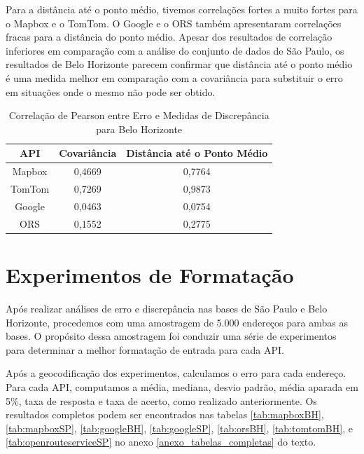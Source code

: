 Para a distância até o ponto médio, tivemos correlações fortes a muito fortes para o Mapbox e o TomTom. O Google e o ORS também apresentaram correlações fracas para a distância do ponto médio. Apesar dos resultados de correlação inferiores em comparação com a análise do conjunto de dados de São Paulo, os resultados de Belo Horizonte parecem confirmar que distância até o ponto médio é uma medida melhor em comparação com a covariância para substituir o erro em situações onde o mesmo não pode ser obtido.

\begin{table}[!ht]
    \centering
    \caption{Correlação de Pearson entre Erro e Medidas de Discrepância para Belo Horizonte}
    \label{tab:correlationBH}
    \begin{adjustbox}{width=0.7\textwidth}
    \begin{tabular}{|c|c|c|}
    \hline
    API & Covariância & Distância até o Ponto Médio \\
    \hline
    Mapbox & 0,4669 & 0,7764 \\
    TomTom & 0,7269 & 0,9873 \\
    Google & 0,0463 & 0,0754 \\
    ORS & 0,1552 & 0,2775 \\
    \hline
    \end{tabular}
    \end{adjustbox}
\end{table}

\section{Experimentos de Formatação}

Após realizar análises de erro e discrepância nas bases de São Paulo e Belo Horizonte, procedemos com uma amostragem de 5.000 endereços para ambas as bases. O propósito dessa amostragem foi conduzir uma série de experimentos para determinar a melhor formatação de entrada para cada API.

Após a geocodificação dos experimentos, calculamos o erro para cada endereço. Para cada API, computamos a média, mediana, desvio padrão, média aparada em 5\%, taxa de resposta e taxa de acerto, como realizado anteriormente. Os resultados completos podem ser encontrados nas tabelas \ref{tab:mapboxBH}, \ref{tab:mapboxSP}, \ref{tab:googleBH}, \ref{tab:googleSP}, \ref{tab:orsBH}, \ref{tab:tomtomBH}, e \ref{tab:openrouteserviceSP} no anexo \ref{anexo_tabelas_completas} do texto.

